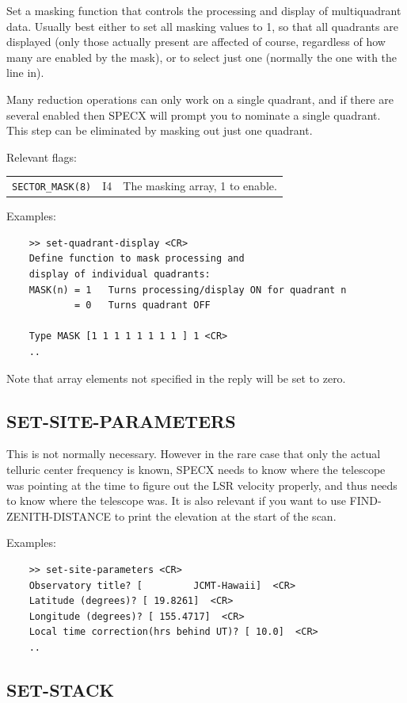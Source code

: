 \documentclass[11pt,twoside]{report}
\begin{document}
Set a masking function that controls the processing and display of
multiquadrant data. Usually best either to set all masking values to 1,
so that all quadrants are displayed (only those actually present are
affected of course, regardless of how many are enabled by the mask), or
to select just one (normally the one with the line in).

Many reduction operations can only work on a single quadrant, and if
there are several enabled then SPECX will prompt you to nominate a
single quadrant. This step can be eliminated by masking out just one
quadrant.

Relevant flags:\\
\begin{tabular}{lll}
  \verb+SECTOR_MASK(8)+ & I4 & The masking array, 1 to enable.
\end{tabular}

Examples:
\begin{verbatim}
    >> set-quadrant-display <CR>
    Define function to mask processing and
    display of individual quadrants:
    MASK(n) = 1   Turns processing/display ON for quadrant n
            = 0   Turns quadrant OFF

    Type MASK [1 1 1 1 1 1 1 1 ] 1 <CR>
    ..
\end{verbatim}
Note that array elements not specified in the reply will be set to zero.

\subsection{SET-SITE-PARAMETERS} 

This is not normally necessary. However in the rare case that only the
actual telluric center frequency is known, SPECX needs to know where the
telescope was pointing at the time to figure out the LSR velocity
properly, and thus needs to know where the telescope was. It is also
relevant if you want to use FIND-ZENITH-DISTANCE to print the elevation
at the start of the scan. 

Examples:
\begin{verbatim}
    >> set-site-parameters <CR>
    Observatory title? [         JCMT-Hawaii]  <CR>
    Latitude (degrees)? [ 19.8261]  <CR>
    Longitude (degrees)? [ 155.4717]  <CR>
    Local time correction(hrs behind UT)? [ 10.0]  <CR>
    ..
\end{verbatim}

\subsection{SET-STACK} 
\end{document}

